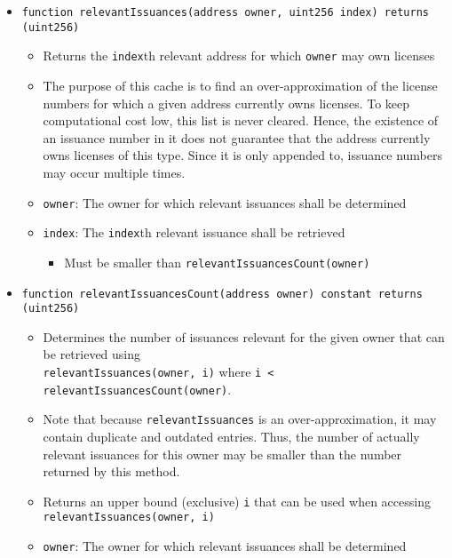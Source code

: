 \documentclass[a4paper]{article}
\begin{document}
\begin{itemize}
  \item \texttt{function relevantIssuances(address owner, uint256 index) returns (uint256)}
  \begin{itemize}
    \item Returns the \texttt{index}th relevant address for which \texttt{owner} may own licenses
    \item The purpose of this cache is to find an over-approximation of the license numbers for which a given address currently owns licenses. To keep computational cost low, this list is never cleared. Hence, the existence of an issuance number in it does not guarantee that the address currently owns licenses of this type. Since it is only appended to, issuance numbers may occur multiple times.
    \item \texttt{owner}: The owner for which relevant issuances shall be determined
    \item \texttt{index}: The \texttt{index}th relevant issuance shall be retrieved
    \begin{itemize}
      \item Must be smaller than \texttt{relevantIssuancesCount(owner)}
    \end{itemize}
  \end{itemize}
  
  \item \texttt{function relevantIssuancesCount(address owner) constant returns (uint256)}
  \begin{itemize}
    \item Determines the number of issuances relevant for the given owner that can be retrieved using \\\texttt{relevantIssuances(owner, i)} where \texttt{i < relevantIssuancesCount(owner)}.
    \item Note that because \texttt{relevantIssuances} is an over-approximation, it may contain duplicate and outdated entries. Thus, the number of actually relevant issuances for this owner may be smaller than the number returned by this method.
    \item Returns an upper bound (exclusive) \texttt{i} that can be used when accessing \texttt{relevantIssuances(owner, i)}
    \item \texttt{owner}: The owner for which relevant issuances shall be determined
  \end{itemize}
  

\end{itemize}
\end{document}

